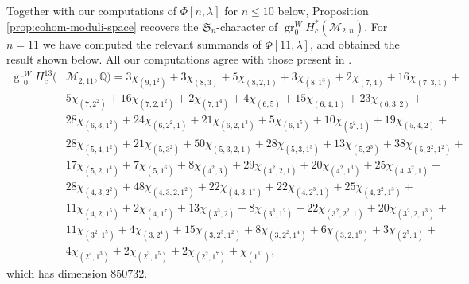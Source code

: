 \documentclass[12pt]{article}
\newcommand{\Q}{\mathbb{Q}}
\newcommand{\SymGroup}[1][n]{\mathfrak{S}_{#1}}
\newcommand{\Specht}[1]{\chi_{#1}}
\newcommand{\ModuliCurve}[1]{\mathcal{M}_{#1}}
\DeclareMathOperator{\gr}{gr}
\theoremstyle{plain}
\theoremstyle{definition}
\theoremstyle{remark}
\begin{document}
Together with our computations of $\Phi[n,\lambda]$ for $n\leq 10$ below, Proposition \ref{prop:cohom-moduli-space} recovers the $\SymGroup$-character of $\gr_0^{W} H_c^*(\ModuliCurve{2,n})$. For $n=11$ we have computed the relevant summands of $\Phi[11,\lambda]$, and obtained the result shown below. All our computations agree with those present in \cite{BCGY21}.%
\begin{align*}
    \gr_0^{W} H_c^{13}(&\ModuliCurve{2,11}, \Q) = 3\Specht{(9,1^2)} + 3\Specht{(8,3)} + 5\Specht{(8,2,1)} + 3\Specht{(8,1^3)} + 2\Specht{(7,4)} + 16\Specht{(7,3,1)} +\\ &5\Specht{(7,2^2)} + 16\Specht{(7,2,1^2)} + 2\Specht{(7,1^4)} + 4\Specht{(6,5)} + 15\Specht{(6,4,1)} + 23\Specht{(6,3,2)} +\\ &28\Specht{(6,3,1^2)} + 24\Specht{(6,2^2,1)} + 21\Specht{(6,2,1^3)} + 5\Specht{(6,1^5)} + 10\Specht{(5^2,1)} + 19\Specht{(5,4,2)} +\\ &28\Specht{(5,4,1^2)} + 21\Specht{(5,3^2)} + 50\Specht{(5,3,2,1)} + 28\Specht{(5,3,1^3)} + 13\Specht{(5,2^3)} + 38\Specht{(5,2^2,1^2)} +\\ &17\Specht{(5,2,1^4)} + 7\Specht{(5,1^6)} + 8\Specht{(4^2,3)} + 29\Specht{(4^2,2,1)} + 20\Specht{(4^2,1^3)} + 25\Specht{(4,3^2,1)} +\\ &28\Specht{(4,3,2^2)} + 48\Specht{(4,3,2,1^2)} + 22\Specht{(4,3,1^4)} + 22\Specht{(4,2^3,1)} + 25\Specht{(4,2^2,1^3)} +\\ &11\Specht{(4,2,1^5)} + 2\Specht{(4,1^7)} + 13\Specht{(3^3,2)} + 8\Specht{(3^3,1^2)} + 22\Specht{(3^2,2^2,1)} + 20\Specht{(3^2,2,1^3)} +\\ &11\Specht{(3^2,1^5)} + 4\Specht{(3,2^4)} + 15\Specht{(3,2^3,1^2)} + 8\Specht{(3,2^2,1^4)} + 6\Specht{(3,2,1^6)} +3\Specht{(2^5,1)} +\\ &4\Specht{(2^4,1^3)} + 2\Specht{(2^3,1^5)} + 2\Specht{(2^2,1^7)} + \Specht{(1^{11})},
\end{align*}
which has dimension $850732$.%

\end{document}
